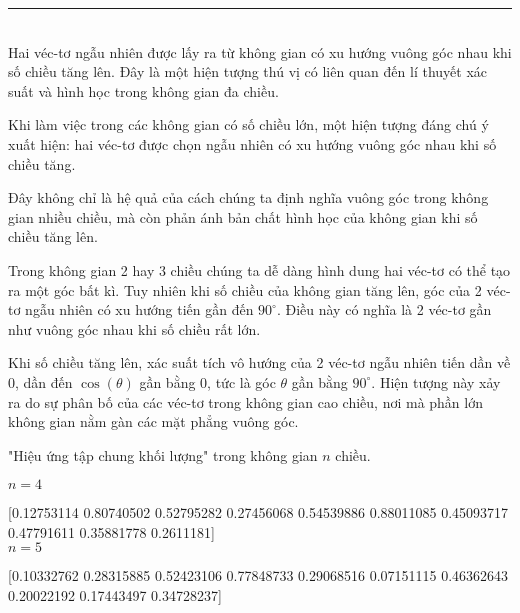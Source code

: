 \documentclass[12pt]{article} %
\begin{document}
\noindent\rule{\linewidth}{.4pt} \\

Hai véc-tơ ngẫu nhiên được lấy ra từ không gian có xu hướng vuông góc nhau khi số chiều tăng lên. Đây là một hiện tượng thú vị có liên quan đến lí thuyết xác suất và hình học trong không gian đa chiều.

Khi làm việc trong các không gian có số chiều lớn, một hiện tượng đáng chú ý xuất hiện: hai véc-tơ được chọn ngẫu nhiên có xu hướng vuông góc nhau khi số chiều tăng.

Đây không chỉ là hệ quả của cách chúng ta định nghĩa vuông góc trong không gian nhiều chiều, mà còn phản ánh bản chất hình học của không gian khi số chiều tăng lên. 

Trong không gian 2 hay 3 chiều chúng ta dễ dàng hình dung hai véc-tơ có thể tạo ra một góc bất kì. Tuy nhiên khi số chiều của không gian tăng lên, góc của 2 véc-tơ ngẫu nhiên có xu hướng tiến gần đến $90^\circ$. Điều này có nghĩa là 2 véc-tơ gần như vuông góc nhau khi số chiều rất lớn.

Khi số chiều tăng lên, xác suất tích vô hướng của 2 véc-tơ ngẫu nhiên tiến dần về 0, dần đến $\cos(\theta)$ gần bằng 0, tức là góc $\theta$ gần bằng $90^\circ$. Hiện tượng này xảy ra do sự phân bố của các véc-tơ trong không gian cao chiều, nơi mà phần lớn không gian nằm gàn các mặt phẳng vuông góc.

"Hiệu ứng tập chung khối lượng" trong không gian $n$ chiều.

$n=4$

[0.12753114 0.80740502 0.52795282 0.27456068 0.54539886 0.88011085 0.45093717 0.47791611 0.35881778 0.2611181] \\

$n=5$

[0.10332762 0.28315885 0.52423106 0.77848733 0.29068516 0.07151115 0.46362643 0.20022192 0.17443497 0.34728237] \\
\end{document}
